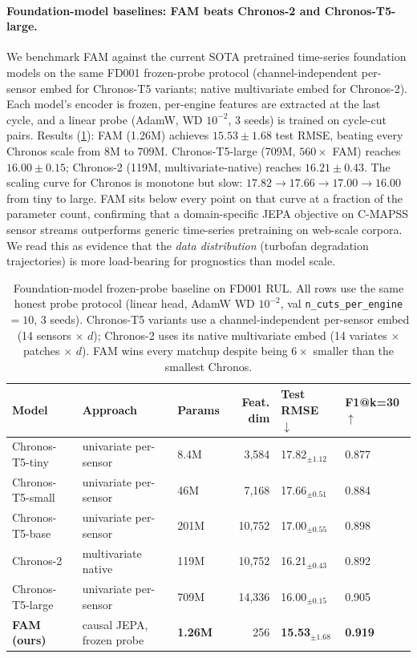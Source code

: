 \documentclass{article}
\begin{document}
\paragraph{Foundation-model baselines: FAM beats Chronos-2 and Chronos-T5-large.} We benchmark FAM against the current SOTA pretrained time-series foundation models on the same FD001 frozen-probe protocol (channel-independent per-sensor embed for Chronos-T5 variants; native multivariate embed for Chronos-2). Each model's encoder is frozen, per-engine features are extracted at the last cycle, and a linear probe (AdamW, WD $10^{-2}$, 3 seeds) is trained on cycle-cut pairs. Results (\cref{tab:chronos}): FAM (1.26M) achieves $15.53 \pm 1.68$ test RMSE, beating every Chronos scale from $8$M to $709$M. Chronos-T5-large (709M, $560\times$ FAM) reaches $16.00 \pm 0.15$; Chronos-2 (119M, multivariate-native) reaches $16.21 \pm 0.43$. The scaling curve for Chronos is monotone but slow: $17.82 \to 17.66 \to 17.00 \to 16.00$ from tiny to large. FAM sits below every point on that curve at a fraction of the parameter count, confirming that a domain-specific JEPA objective on C-MAPSS sensor streams outperforms generic time-series pretraining on web-scale corpora. We read this as evidence that the \emph{data distribution} (turbofan degradation trajectories) is more load-bearing for prognostics than model scale.

\begin{table}[h]
\centering
\caption{Foundation-model frozen-probe baseline on FD001 RUL. All rows use the same honest probe protocol (linear head, AdamW WD $10^{-2}$, val \texttt{n\_cuts\_per\_engine}$=10$, 3 seeds). Chronos-T5 variants use a channel-independent per-sensor embed (14 sensors $\times$ $d$); Chronos-2 uses its native multivariate embed (14 variates $\times$ patches $\times$ $d$). FAM wins every matchup despite being $6\times$ smaller than the smallest Chronos.}
\label{tab:chronos}
\small
\begin{tabular}{@{}lllrll@{}}
\toprule
Model & Approach & Params & Feat. dim & Test RMSE $\downarrow$ & F1@k=30 $\uparrow$ \\
\midrule
Chronos-T5-tiny   & univariate per-sensor    & 8.4M   & 3,584 & 17.82$_{\pm1.12}$ & 0.877 \\
Chronos-T5-small  & univariate per-sensor    & 46M    & 7,168 & 17.66$_{\pm0.51}$ & 0.884 \\
Chronos-T5-base   & univariate per-sensor    & 201M   & 10,752 & 17.00$_{\pm0.55}$ & 0.898 \\
Chronos-2         & multivariate native      & 119M   & 10,752 & 16.21$_{\pm0.43}$ & 0.892 \\
Chronos-T5-large  & univariate per-sensor    & 709M   & 14,336 & 16.00$_{\pm0.15}$ & 0.905 \\
\midrule
\textbf{FAM (ours)}   & causal JEPA, frozen probe & \textbf{1.26M} & 256 & \textbf{15.53}$_{\pm1.68}$ & \textbf{0.919} \\
\bottomrule
\end{tabular}
\end{table}
\end{document}
